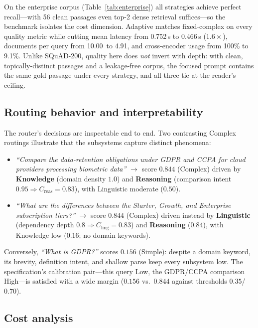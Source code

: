 \documentclass[11pt]{article}
\newcommand{\enAdLat}{0.466}\newcommand{\enAdDocs}{4.91}\newcommand{\enAdRr}{9.1}
\newcommand{\enCoLat}{0.752}\newcommand{\enCoDocs}{10.00}\newcommand{\enCoRr}{100.0}
\begin{document}
On the enterprise corpus (Table~\ref{tab:enterprise}) all strategies achieve
perfect recall---with 56 clean passages even top-2 dense retrieval
suffices---so the benchmark isolates the cost dimension. Adaptive matches
fixed-complex on every quality metric while cutting mean latency from
\enCoLat\,s to \enAdLat\,s ($1.6\times$), documents per query from \enCoDocs\
to \enAdDocs, and cross-encoder usage from 100\% to \enAdRr\%. Unlike
SQuAD-200, quality here does \emph{not} invert with depth: with clean,
topically-distinct passages and a leakage-free corpus, the focused prompt
contains the same gold passage under every strategy, and all three tie at the
reader's ceiling.

\subsection{Routing behavior and interpretability}

The router's decisions are inspectable end to end. Two contrasting Complex
routings illustrate that the subsystems capture distinct phenomena:

\begin{itemize}
\item \emph{``Compare the data-retention obligations under GDPR and CCPA for
cloud providers processing biometric data''} $\rightarrow$ score $0.844$
(Complex) driven by \textbf{Knowledge} (domain density $1.0$) and
\textbf{Reasoning} (comparison intent $0.95 \Rightarrow C_{\mathrm{reas}} =
0.83$), with Linguistic moderate ($0.50$).
\item \emph{``What are the differences between the Starter, Growth, and
Enterprise subscription tiers?''} $\rightarrow$ score $0.844$ (Complex) driven
instead by \textbf{Linguistic} (dependency depth $0.8 \Rightarrow
C_{\mathrm{ling}} = 0.83$) and \textbf{Reasoning} ($0.84$), with Knowledge low
($0.16$; no domain keywords).
\end{itemize}

Conversely, \emph{``What is GDPR?''} scores $0.156$ (Simple): despite a domain
keyword, its brevity, definition intent, and shallow parse keep every
subsystem low. The specification's calibration pair---this query Low, the
GDPR/CCPA comparison High---is satisfied with a wide margin
($0.156$ vs.\ $0.844$ against thresholds $0.35$/$0.70$).

\subsection{Cost analysis}
\end{document}

